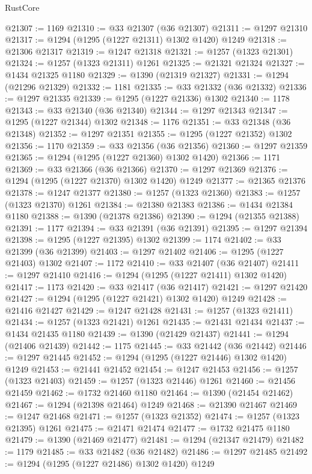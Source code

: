 \begin{lexlean}{RustCore}
\begin{coremodule}
@21307 := 1169
@21310 := @33 @21307 (@36 @21307)
@21311 := @1297 @21310
@21317 := @1294 (@1295 (@1227 @21311) @1302 @1420) @1249
@21318 := @21306 @21317
@21319 := @1247 @21318
@21321 := @1257 (@1323 @21301)
@21324 := @1257 (@1323 @21311) @1261
@21325 := @21321 @21324
@21327 := @1434 @21325 @1180
@21329 := @1390 (@21319 @21327)
@21331 := @1294 (@21296 @21329)
@21332 := 1181
@21335 := @33 @21332 (@36 @21332)
@21336 := @1297 @21335
@21339 := @1295 (@1227 @21336) @1302
@21340 := 1178
@21343 := @33 @21340 (@36 @21340)
@21344 := @1297 @21343
@21347 := @1295 (@1227 @21344) @1302
@21348 := 1176
@21351 := @33 @21348 (@36 @21348)
@21352 := @1297 @21351
@21355 := @1295 (@1227 @21352) @1302
@21356 := 1170
@21359 := @33 @21356 (@36 @21356)
@21360 := @1297 @21359
@21365 := @1294 (@1295 (@1227 @21360) @1302 @1420)
@21366 := 1171
@21369 := @33 @21366 (@36 @21366)
@21370 := @1297 @21369
@21376 := @1294 (@1295 (@1227 @21370) @1302 @1420) @1249
@21377 := @21365 @21376
@21378 := @1247 @21377
@21380 := @1257 (@1323 @21360)
@21383 := @1257 (@1323 @21370) @1261
@21384 := @21380 @21383
@21386 := @1434 @21384 @1180
@21388 := @1390 (@21378 @21386)
@21390 := @1294 (@21355 @21388)
@21391 := 1177
@21394 := @33 @21391 (@36 @21391)
@21395 := @1297 @21394
@21398 := @1295 (@1227 @21395) @1302
@21399 := 1174
@21402 := @33 @21399 (@36 @21399)
@21403 := @1297 @21402
@21406 := @1295 (@1227 @21403) @1302
@21407 := 1172
@21410 := @33 @21407 (@36 @21407)
@21411 := @1297 @21410
@21416 := @1294 (@1295 (@1227 @21411) @1302 @1420)
@21417 := 1173
@21420 := @33 @21417 (@36 @21417)
@21421 := @1297 @21420
@21427 := @1294 (@1295 (@1227 @21421) @1302 @1420) @1249
@21428 := @21416 @21427
@21429 := @1247 @21428
@21431 := @1257 (@1323 @21411)
@21434 := @1257 (@1323 @21421) @1261
@21435 := @21431 @21434
@21437 := @1434 @21435 @1180
@21439 := @1390 (@21429 @21437)
@21441 := @1294 (@21406 @21439)
@21442 := 1175
@21445 := @33 @21442 (@36 @21442)
@21446 := @1297 @21445
@21452 := @1294 (@1295 (@1227 @21446) @1302 @1420) @1249
@21453 := @21441 @21452
@21454 := @1247 @21453
@21456 := @1257 (@1323 @21403)
@21459 := @1257 (@1323 @21446) @1261
@21460 := @21456 @21459
@21462 := @1732 @21460 @1180
@21464 := @1390 (@21454 @21462)
@21467 := @1294 (@21398 @21464) @1249
@21468 := @21390 @21467
@21469 := @1247 @21468
@21471 := @1257 (@1323 @21352)
@21474 := @1257 (@1323 @21395) @1261
@21475 := @21471 @21474
@21477 := @1732 @21475 @1180
@21479 := @1390 (@21469 @21477)
@21481 := @1294 (@21347 @21479)
@21482 := 1179
@21485 := @33 @21482 (@36 @21482)
@21486 := @1297 @21485
@21492 := @1294 (@1295 (@1227 @21486) @1302 @1420) @1249

\end{coremodule}
\end{lexlean}
